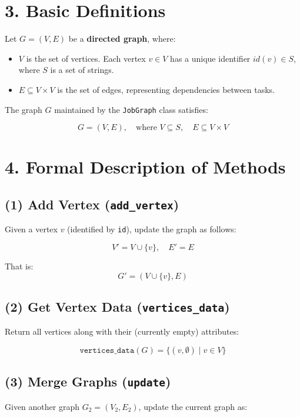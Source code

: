 \documentclass{article}
\begin{document}
\section*{3. Basic Definitions}

Let $G = (V, E)$ be a \textbf{directed graph}, where:

\begin{itemize}
    \item $V$ is the set of vertices. Each vertex $v \in V$ has a unique identifier $id(v) \in S$, where $S$ is a set of strings.
    \item $E \subseteq V \times V$ is the set of edges, representing dependencies between tasks.
\end{itemize}

The graph $G$ maintained by the \texttt{JobGraph} class satisfies:

\[
G = (V, E), \quad \text{where } V \subseteq S,\quad E \subseteq V \times V
\]

\section*{4. Formal Description of Methods}

\subsection*{(1) Add Vertex (\texttt{add\_vertex})}

Given a vertex $v$ (identified by \texttt{id}), update the graph as follows:

\[
V' = V \cup \{v\}, \quad E' = E
\]

That is:
\[
G' = (V \cup \{v\}, E)
\]

\subsection*{(2) Get Vertex Data (\texttt{vertices\_data})}

Return all vertices along with their (currently empty) attributes:

\[
\texttt{vertices\_data}(G) = \{ (v, \emptyset) \mid v \in V \}
\]

\subsection*{(3) Merge Graphs (\texttt{update})}

Given another graph $G_2 = (V_2, E_2)$, update the current graph as:
\end{document}
